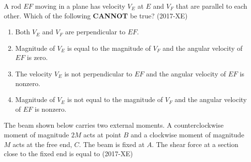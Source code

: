 \item A rod $EF$ moving in a plane has velocity $V_E$ at $E$ and $V_F$ that are parallel to each other. Which of the following \textbf{CANNOT} be true? \hfill(2017-XE)
\begin{figure}[!ht]
\centering
{}%

\label{fig:my_label}
\end{figure}
\begin{enumerate}
    \item Both $V_E$ and $V_F$ are perpendicular to $EF$.
    \item Magnitude of $V_E$ is equal to the magnitude of $V_F$ and the angular velocity of $EF$ is zero.
    \item The velocity $V_E$ is not perpendicular to $EF$ and the angular velocity of $EF$ is nonzero.
    \item Magnitude of $V_E$ is not equal to the magnitude of $V_F$ and the angular velocity of $EF$ is nonzero.
\end{enumerate}
\item The beam shown below carries two external moments. A counterclockwise moment of magnitude $2M$ acts at point $B$ and a clockwise moment of magnitude $M$ acts at the free end, $C$. The beam is fixed at $A$. The shear force at a section close to the fixed end is equal to \hfill(2017-XE)
